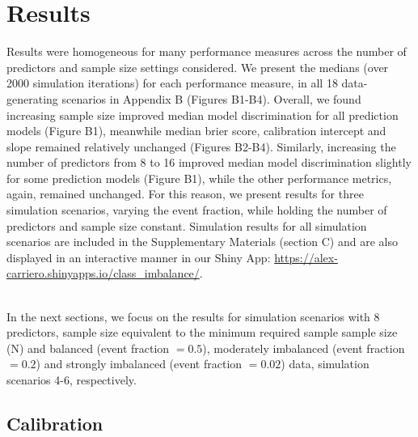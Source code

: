 \documentclass[AMA,STIX1COL,]{WileyNJD-v2}
\begin{document}
\hypertarget{results}{%
\section{Results}\label{results}}

Results were homogeneous for many performance measures across the number
of predictors and sample size settings considered. We present the
medians (over 2000 simulation iterations) for each performance measure,
in all 18 data-generating scenarios in Appendix B (Figures B1-B4).
Overall, we found increasing sample size improved median model
discrimination for all prediction models (Figure B1), meanwhile median
brier score, calibration intercept and slope remained relatively
unchanged (Figures B2-B4). Similarly, increasing the number of
predictors from 8 to 16 improved median model discrimination slightly
for some prediction models (Figure B1), while the other performance
metrics, again, remained unchanged. For this reason, we present results
for three simulation scenarios, varying the event fraction, while
holding the number of predictors and sample size constant. Simulation
results for all simulation scenarios are included in the Supplementary
Materials (section C) and are also displayed in an interactive manner in
our Shiny App:
\url{https://alex-carriero.shinyapps.io/class_imbalance/}.\\
\strut \\
In the next sections, we focus on the results for simulation scenarios
with 8 predictors, sample size equivalent to the minimum required sample
sample size (N) and balanced (event fraction \(= 0.5\)), moderately
imbalanced (event fraction \(=0.2\)) and strongly imbalanced (event
fraction \(=0.02\)) data, simulation scenarios 4-6, respectively.

\hypertarget{calibration}{%
\subsection{Calibration}\label{calibration}}
\end{document}
